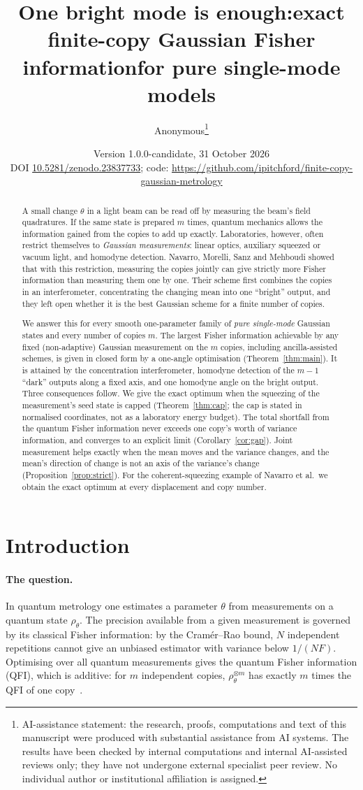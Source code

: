 \documentclass[11pt,a4paper]{article}
\title{One bright mode is enough:\newline exact finite-copy Gaussian Fisher information\newline for pure single-mode models}
\author{Anonymous\thanks{AI-assistance statement: the research, proofs, computations and text of this manuscript were produced with substantial assistance from AI systems. The results have been checked by internal computations and internal AI-assisted reviews only; they have not undergone external specialist peer review. No individual author or institutional affiliation is assigned.}}
\date{Version 1.0.0-candidate, 31 October 2026\\[2pt]\small DOI \href{https://doi.org/10.5281/zenodo.23837733}{10.5281/zenodo.23837733}; code: \url{https://github.com/ipitchford/finite-copy-gaussian-metrology}}
\theoremstyle{definition}\newtheorem{definition}{Definition}
\theoremstyle{remark}\newtheorem{remark}{Remark}
\begin{document}
\maketitle
\begin{abstract}
A small change $\theta$ in a light beam can be read off by measuring the beam's field quadratures. If the same state is prepared $m$ times, quantum mechanics allows the information gained from the copies to add up exactly. Laboratories, however, often restrict themselves to \emph{Gaussian measurements}: linear optics, auxiliary squeezed or vacuum light, and homodyne detection. Navarro, Morelli, Sanz and Mehboudi showed that with this restriction, measuring the copies jointly can give strictly more Fisher information than measuring them one by one. Their scheme first combines the copies in an interferometer, concentrating the changing mean into one ``bright'' output, and they left open whether it is the best Gaussian scheme for a finite number of copies.

We answer this for every smooth one-parameter family of \emph{pure single-mode} Gaussian states and every number of copies $m$. The largest Fisher information achievable by any fixed (non-adaptive) Gaussian measurement on the $m$ copies, including ancilla-assisted schemes, is given in closed form by a one-angle optimisation (Theorem~\ref{thm:main}). It is attained by the concentration interferometer, homodyne detection of the $m-1$ ``dark'' outputs along a fixed axis, and one homodyne angle on the bright output. Three consequences follow. We give the exact optimum when the squeezing of the measurement's seed state is capped (Theorem~\ref{thm:cap}; the cap is stated in normalised coordinates, not as a laboratory energy budget). The total shortfall from the quantum Fisher information never exceeds one copy's worth of variance information, and converges to an explicit limit (Corollary~\ref{cor:gap}). Joint measurement helps exactly when the mean moves and the variance changes, and the mean's direction of change is not an axis of the variance's change (Proposition~\ref{prop:strict}). For the coherent-squeezing example of Navarro et al.\ we obtain the exact optimum at every displacement and copy number.
\end{abstract}

\section{Introduction}

\paragraph{The question.}
In quantum metrology one estimates a parameter $\theta$ from measurements on a quantum state $\rho_\theta$. The precision available from a given measurement is governed by its classical Fisher information: by the Cram\'er--Rao bound, $N$ independent repetitions cannot give an unbiased estimator with variance below $1/(N F)$. Optimising over all quantum measurements gives the quantum Fisher information (QFI), which is additive: for $m$ independent copies, $\rho_\theta^{\otimes m}$ has exactly $m$ times the QFI of one copy~\cite{BraunsteinCaves1994}.
\end{document}
